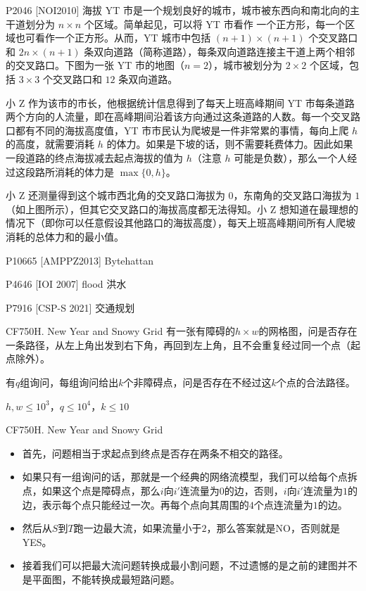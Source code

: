 \begin{frame}{P2046 [NOI2010] 海拔}
    YT 市是一个规划良好的城市，城市被东西向和南北向的主干道划分为 $n \times n$ 个区域。简单起见，可以将 YT 市看作 一个正方形，每一个区域也可看作一个正方形。从而，YT 城市中包括 $(n+1) \times (n+1)$ 个交叉路口和 $2n \times (n+1)$ 条双向道路（简称道路），每条双向道路连接主干道上两个相邻的交叉路口。下图为一张 YT 市的地图（$n = 2$），城市被划分为 $2 \times 2$ 个区域，包括 $3 \times 3$ 个交叉路口和 $12$ 条双向道路。

    小 Z 作为该市的市长，他根据统计信息得到了每天上班高峰期间 YT 市每条道路两个方向的人流量，即在高峰期间沿着该方向通过这条道路的人数。每一个交叉路口都有不同的海拔高度值，YT 市市民认为爬坡是一件非常累的事情，每向上爬 $h$ 的高度，就需要消耗 $h$ 的体力。如果是下坡的话，则不需要耗费体力。因此如果一段道路的终点海拔减去起点海拔的值为 $h$（注意 $h$ 可能是负数），那么一个人经过这段路所消耗的体力是 $\max\{0, h\}$。

    小 Z 还测量得到这个城市西北角的交叉路口海拔为 $0$，东南角的交叉路口海拔为 $1$（如上图所示），但其它交叉路口的海拔高度都无法得知。小 Z 想知道在最理想的情况下（即你可以任意假设其他路口的海拔高度），每天上班高峰期间所有人爬坡消耗的总体力和的最小值。
\end{frame}

\begin{frame}{P10665 [AMPPZ2013] Bytehattan}
\end{frame}

\begin{frame}{P4646 [IOI 2007] flood 洪水}
\end{frame}

\begin{frame}{P7916 [CSP-S 2021] 交通规划}
\end{frame}

\begin{frame}{CF750H. New Year and Snowy Grid}
    有一张有障碍的$h \times w$的网格图，问是否存在一条路径，从左上角出发到右下角，再回到左上角，且不会重复经过同一个点（起点除外）。
    
    有$q$组询问，每组询问给出$k$个非障碍点，问是否存在不经过这$k$个点的合法路径。

    $h,w \le 10^3，q \le 10^4，k \le 10$
\end{frame}

\begin{frame}{CF750H. New Year and Snowy Grid}
    \begin{itemize}
        \item 首先，问题相当于求起点到终点是否存在两条不相交的路径。
        \item 如果只有一组询问的话，那就是一个经典的网络流模型，我们可以给每个点拆点，如果这个点是障碍点，那么$i$向$i'$连流量为$0$的边，否则，$i$向$i'$连流量为$1$的边，表示每个点只能经过一次。再每个点向其周围的$4$个点连流量为$1$的边。
        \item 然后从$S$到$T$跑一边最大流，如果流量小于$2$，那么答案就是NO，否则就是YES。
        \item 接着我们可以把最大流问题转换成最小割问题，不过遗憾的是之前的建图并不是平面图，不能转换成最短路问题。
    \end{itemize}
\end{frame}

